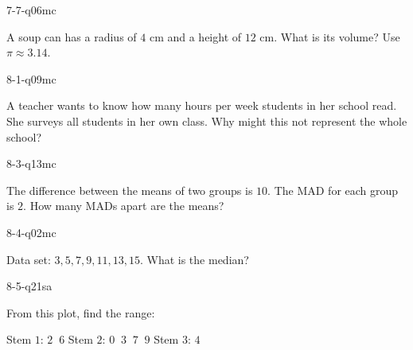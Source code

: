 \begin{practiceQuestion}{7-7-q06}{mc}
\begin{questionText}
A soup can has a radius of $4$ cm and a height of $12$ cm. What is its volume? Use $\pi \approx 3.14$.
\end{questionText}
\end{practiceQuestion}

\begin{practiceQuestion}{8-1-q09}{mc}
\begin{questionText}
A teacher wants to know how many hours per week students in her school read. She surveys all students in her own class. Why might this not represent the whole school?
\end{questionText}
\end{practiceQuestion}

\begin{practiceQuestion}{8-3-q13}{mc}
\begin{questionText}
The difference between the means of two groups is $10$. The MAD for each group is $2$. How many MADs apart are the means?
\end{questionText}
\end{practiceQuestion}

\begin{practiceQuestion}{8-4-q02}{mc}
\begin{questionText}
Data set: $3, 5, 7, 9, 11, 13, 15$. What is the median?
\end{questionText}
\end{practiceQuestion}

\begin{practiceQuestion}{8-5-q21}{sa}
\begin{questionText}
From this plot, find the range:

Stem $1$: $2\;\;6$ \quad Stem $2$: $0\;\;3\;\;7\;\;9$ \quad Stem $3$: $4$
\end{questionText}
\end{practiceQuestion}

